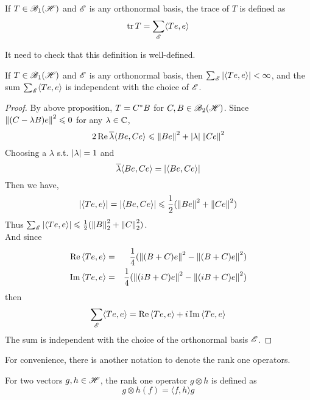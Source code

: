 \begin{defn}
	If $T \in \mathscr{B}_{1}\mathscr{(H)}$ and $\mathscr{E}$ is any orthonormal basis, the trace of $T$ is defined as
	\begin{equation*}
		\operatorname{tr}{T} = \sum_{\mathscr{E}} \langle Te,e \rangle
	\end{equation*}
\end{defn}

It need to check that this definition is well-defined.

\begin{prop}
	If $T \in \mathscr{B}_{1}\mathscr{(H)}$ and $\mathscr{E}$ is any orthonormal basis, then $\sum_{\mathscr{E}} \left\lvert\langle Te,e \rangle\right\lvert < \infty$, and the sum $\sum_{\mathscr{E}} \langle Te,e \rangle$ is independent with the choice of $\mathscr{E}$.
\end{prop}
\begin{proof}
	By above proposition, $T = C^{*}B$ for $C,B \in \mathscr{B}_{2}\mathscr{(H)}$. Since\\ $\left\lVert(C-\lambda B)e\right\lVert^2 \leqslant 0$ for any $\lambda \in \mathbb{C}$,
	\begin{equation*}
		2 \operatorname{Re}{\overline{\lambda} \langle Be,Ce \rangle} \leqslant \left\lVert Be\right\lVert^2+\left\lvert\lambda\right\lvert \left\lVert Ce\right\lVert^2
	\end{equation*}
	Choosing a $\lambda$ s.t. $\left\lvert\lambda\right\lvert = 1$ and
	\begin{equation*}
		\overline{\lambda} \langle Be,Ce \rangle = \left\lvert\langle Be,Ce \rangle\right\lvert
	\end{equation*}
	Then we have,
	\begin{equation*}
		\left\lvert\langle Te,e \rangle\right\lvert = \left\lvert\langle Be,Ce \rangle\right\lvert \leqslant \frac{1}{2}(\left\lVert Be\right\lVert^2+\left\lVert Ce\right\lVert^2)
	\end{equation*}
	Thus $\sum_{\mathscr{E}} \left\lvert\langle Te,e \rangle\right\lvert \leqslant \frac{1}{2}(\left\lVert B\right\lVert_2^2+\left\lVert C\right\lVert_2^2)$. \\ 
	And since 
	\begin{eqnarray*}
		\operatorname{Re}{\langle Te,e \rangle} &=& \frac{1}{4} (\left\lVert(B+C)e\right\lVert^2 - \left\lVert(B+C)e\right\lVert^2) \\
		\operatorname{Im}{\langle Te,e \rangle} &=& \frac{1}{4} (\left\lVert(iB+C)e\right\lVert^2 - \left\lVert(iB+C)e\right\lVert^2)
	\end{eqnarray*}
	then
	\begin{equation*}
		\sum_{\mathscr{E}} \langle Te,e \rangle = \operatorname{Re}{\langle Te,e \rangle} + i\operatorname{Im}{\langle Te,e \rangle}
	\end{equation*}
	The sum is independent with the choice of the orthonormal basis $\mathscr{E}$.
\end{proof}

For convenience, there is another notation to denote the rank one operators.
\begin{defn}
	For two vectors $g,h \in \mathscr{H}$, the rank one operator $g \otimes h$ is defined as
	\begin{equation*}
		g \otimes h (f) = \langle f,h \rangle g
	\end{equation*}
\end{defn}

